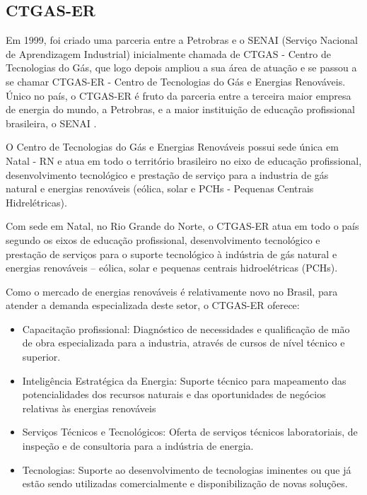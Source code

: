 \subsection{CTGAS-ER}
\label{Sec:cetgas-er}

Em 1999, foi criado uma parceria entre a Petrobras e o SENAI (Serviço Nacional de Aprendizagem Industrial) inicialmente chamada de CTGAS - Centro de Tecnologias do Gás, que logo depois ampliou a sua área de atuação e se passou a se chamar CTGAS-ER - Centro de Tecnologias do Gás e Energias Renováveis. Único no país, o CTGAS-ER é fruto da parceria entre a terceira maior empresa de energia do mundo, a Petrobras, e a maior instituição de educação profissional brasileira, o SENAI \cite{ctgas-apresentacao}.

O Centro de Tecnologias do Gás e Energias Renováveis possui sede única em Natal - RN e atua em todo o território brasileiro no eixo de educação profissional, desenvolvimento tecnológico e prestação de serviço para a industria de gás natural e energias renováveis (eólica, solar e PCHs - Pequenas Centrais Hidrelétricas).

Com sede em Natal, no Rio Grande do Norte, o CTGAS-ER atua em todo o país segundo os eixos de educação profissional, desenvolvimento tecnológico e prestação de serviços para o suporte tecnológico à indústria de gás natural e energias renováveis – eólica, solar e pequenas centrais hidroelétricas (PCHs).

Como o mercado de energias renováveis é relativamente novo no Brasil, para atender a demanda especializada deste setor, o CTGAS-ER oferece:

\begin{itemize}
    \item Capacitação profissional: Diagnóstico de necessidades e qualificação de mão de obra especializada para a industria, através de cursos de nível técnico e superior.
    \item Inteligência Estratégica da Energia: Suporte técnico para mapeamento das potencialidades dos recursos naturais e das oportunidades de negócios relativas às energias renováveis
    \item Serviços Técnicos e Tecnológicos: Oferta de serviços técnicos laboratoriais, de inspeção e de consultoria para a indústria de energia.
    \item Tecnologias: Suporte ao desenvolvimento de tecnologias iminentes ou que já estão sendo utilizadas comercialmente e disponibilização de novas soluções.
\end{itemize}

